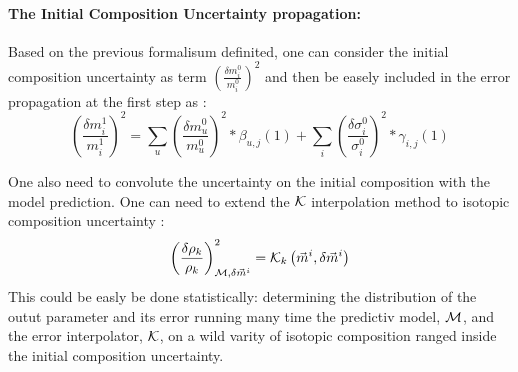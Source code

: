 \documentclass[dvips,12pt]{article}
\begin{document}



\paragraph{The Initial Composition Uncertainty propagation:\\}
Based on the previous formalisum definited, one
can consider the initial composition uncertainty
as term $\left( \frac{\delta m_i^{0}}{m_i^{0}} \right)^{2}$
and then be easely included in the error
propagation  at the first step as :\\
\begin{equation}
  \left( \frac{\delta m_i^{1}}{m_i^{1}} \right)^{2} = \sum_{u}\left( \frac{\delta m_u^{0}}{m_u^{0}} \right)^{2} *\beta_{u,j}(1) + \sum_{i}\left( \frac{\delta \sigma_i^{0}}{\sigma_i^{0}} \right)^{2} *\gamma_{i,j}(1) \label{eq:dm0}
\end{equation}



One also need to convolute the uncertainty on the
initial composition with the model prediction.
One can need to extend the ${\cal K}$ interpolation method to isotopic composition uncertainty :
\begin{equation}
  \left( \frac{\delta \rho_k}{\rho_k} \right)^{2} _{{\cal M}, \delta \vec{m}^{i}} = {\cal K}_k \left( \vec{m}^{i} , \delta\vec{m}^{i} \right)
\end{equation}
This could be easly be done statistically:
determining the distribution of the outut
parameter and its error running many time the
predictiv model, ${\cal M}$, and the error
interpolator, ${\cal K}$, on a wild varity of
isotopic composition ranged inside the initial
composition uncertainty.
\end{document}

